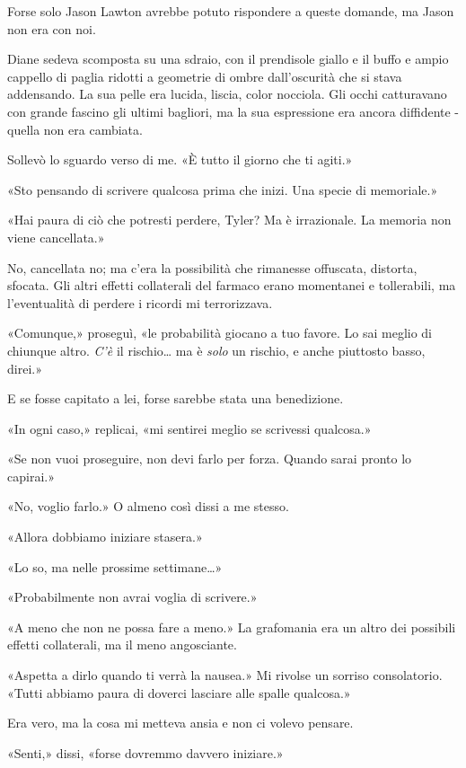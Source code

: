 Forse solo Jason Lawton avrebbe potuto rispondere a queste domande, ma
Jason non era con noi.

Diane sedeva scomposta su una sdraio, con il prendisole giallo e il
buffo e ampio cappello di paglia ridotti a geometrie di ombre
dall'oscurità che si stava addensando. La sua pelle era lucida, liscia,
color nocciola. Gli occhi catturavano con grande fascino gli ultimi
bagliori, ma la sua espressione era ancora diffidente - quella non era
cambiata.

Sollevò lo sguardo verso di me. «È tutto il giorno che ti agiti.»

«Sto pensando di scrivere qualcosa prima che inizi. Una specie di
memoriale.»

«Hai paura di ciò che potresti perdere, Tyler? Ma è irrazionale. La
memoria non viene cancellata.»

No, cancellata no; ma c'era la possibilità che rimanesse offuscata,
distorta, sfocata. Gli altri effetti collaterali del farmaco erano
momentanei e tollerabili, ma l'eventualità di perdere i ricordi mi
terrorizzava.

«Comunque,» proseguì, «le probabilità giocano a tuo favore. Lo sai
meglio di chiunque altro. \emph{C'è} il rischio\ldots{} ma è \emph{solo}
un rischio, e anche piuttosto basso, direi.»

E se fosse capitato a lei, forse sarebbe stata una benedizione.

«In ogni caso,» replicai, «mi sentirei meglio se scrivessi qualcosa.»

«Se non vuoi proseguire, non devi farlo per forza. Quando sarai pronto
lo capirai.»

«No, voglio farlo.» O almeno così dissi a me stesso.

«Allora dobbiamo iniziare stasera.»

«Lo so, ma nelle prossime settimane\ldots»

«Probabilmente non avrai voglia di scrivere.»

«A meno che non ne possa fare a meno.» La grafomania era un altro dei
possibili effetti collaterali, ma il meno angosciante.

«Aspetta a dirlo quando ti verrà la nausea.» Mi rivolse un sorriso
consolatorio. «Tutti abbiamo paura di doverci lasciare alle spalle
qualcosa.»

Era vero, ma la cosa mi metteva ansia e non ci volevo pensare.

«Senti,» dissi, «forse dovremmo davvero iniziare.»

